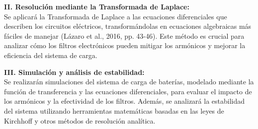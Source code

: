 \textbf{II. Resolución mediante la Transformada de Laplace:}\\
Se aplicará la Transformada de Laplace a las ecuaciones diferenciales que describen
los circuitos eléctricos, transformándolas en ecuaciones algebraicas más fáciles de
manejar (Lázaro et al., 2016, pp. 43-46). Este método es crucial para analizar cómo
los filtros electrónicos pueden mitigar los armónicos y mejorar la eficiencia del
sistema de carga.

\textbf{III. Simulación y análisis de estabilidad:}\\
Se realizarán simulaciones del sistema de carga de baterías, modelado mediante la
función de transferencia y las ecuaciones diferenciales, para evaluar el impacto de
los armónicos y la efectividad de los filtros. Además, se analizará la estabilidad del
sistema utilizando herramientas matemáticas basadas en las leyes de Kirchhoff y
otros métodos de resolución analítica.